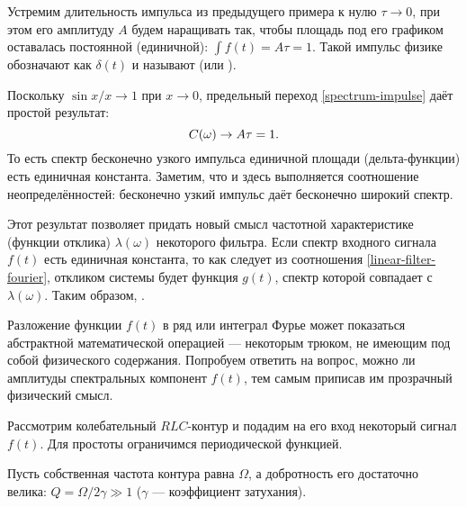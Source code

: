 \begin{lab:example}\label{example:delta}
Устремим длительность импульса из предыдущего примера к нулю $\tau\to 0$,
при этом его амплитуду $A$ будем наращивать так, чтобы площадь
под его графиком оставалась постоянной (единичной): $\int f(t) = A \tau = 1$.
Такой импульс физике обозначают как $\delta(t)$ и называют 
(или ).

Поскольку $\sin x/x\to 1$ при $x\to 0$,
предельный переход \eqref{spectrum-impulse} даёт простой результат:
\begin{equation}
    \eqmark{spectrum-delta}
    C(\omega)\to A\tau =1.
\end{equation}
То есть спектр бесконечно узкого импульса единичной площади (дельта-функции)
есть единичная константа. Заметим, что и здесь выполняется соотношение
неопределённостей: бесконечно узкий импульс даёт бесконечно широкий спектр.

Этот результат позволяет придать новый смысл частотной характеристике
(функции отклика) $\lambda(\omega)$ некоторого фильтра.
Если спектр входного сигнала $f(t)$ есть единичная константа,
то как следует из соотношения \eqref{linear-filter-fourier},
откликом системы будет функция $g(t)$, спектр которой совпадает
с $\lambda(\omega)$. Таким образом, .
\end{lab:example}


\label{sec:spectrum-meaning}

Разложение функции $f(t)$ в ряд или интеграл Фурье может показаться
абстрактной математической операцией --- некоторым трюком, не имеющим
под собой физического содержания. Попробуем ответить на вопрос,
можно ли  амплитуды спектральных компонент $f(t)$,
тем самым приписав им прозрачный физический смысл.

Рассмотрим колебательный $RLC$-контур и подадим на его вход некоторый сигнал $f(t)$.
Для простоты ограничимся периодической функцией.

Пусть собственная частота контура равна $\Omega$, а добротность его
достаточно велика: $Q=\Omega/2\gamma \gg 1$ ($\gamma$ --- коэффициент затухания).


